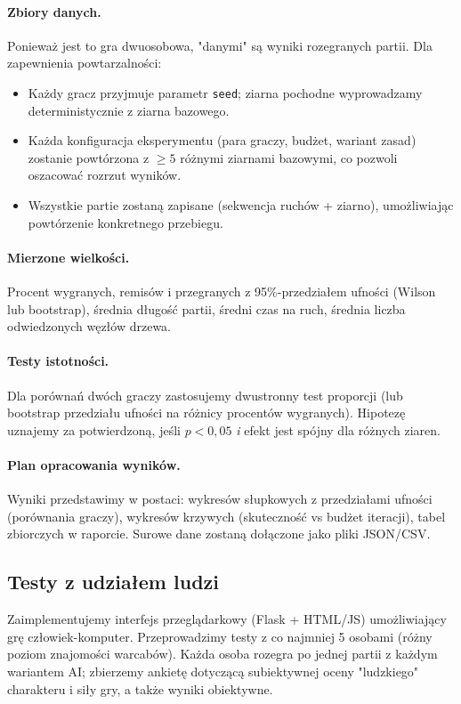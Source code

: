 \documentclass[11pt,a4paper]{article}
\begin{document}
\paragraph{Zbiory danych.} Ponieważ jest to gra dwuosobowa, "danymi"
są wyniki rozegranych partii. Dla zapewnienia powtarzalności:
\begin{itemize}
    \item Każdy gracz przyjmuje parametr \texttt{seed}; ziarna pochodne
        wyprowadzamy deterministycznie z ziarna bazowego.
    \item Każda konfiguracja eksperymentu (para graczy, budżet, wariant
        zasad) zostanie powtórzona z $\geq 5$ różnymi ziarnami bazowymi,
        co pozwoli oszacować rozrzut wyników.
    \item Wszystkie partie zostaną zapisane (sekwencja ruchów + ziarno),
        umożliwiając powtórzenie konkretnego przebiegu.
\end{itemize}

\paragraph{Mierzone wielkości.} Procent wygranych, remisów i przegranych
z 95\%-przedziałem ufności (Wilson lub bootstrap), średnia długość
partii, średni czas na ruch, średnia liczba odwiedzonych węzłów drzewa.

\paragraph{Testy istotności.} Dla porównań dwóch graczy zastosujemy
dwustronny test proporcji (lub bootstrap przedziału ufności na różnicy
procentów wygranych). Hipotezę uznajemy za potwierdzoną, jeśli
$p < 0{,}05$ \emph{i} efekt jest spójny dla różnych ziaren.

\paragraph{Plan opracowania wyników.} Wyniki przedstawimy w postaci:
wykresów słupkowych z przedziałami ufności (porównania
graczy), wykresów krzywych (skuteczność vs budżet iteracji), tabel
zbiorczych w raporcie. Surowe dane zostaną dołączone jako pliki
JSON/CSV.

\subsection{Testy z udziałem ludzi}

Zaimplementujemy interfejs przeglądarkowy (Flask + HTML/JS) umożliwiający
grę człowiek-komputer. Przeprowadzimy testy z co najmniej 5 osobami
(różny poziom znajomości warcabów). Każda osoba rozegra po jednej
partii z każdym wariantem AI; zbierzemy ankietę dotyczącą subiektywnej
oceny "ludzkiego" charakteru i siły gry, a także wyniki obiektywne.
\end{document}
